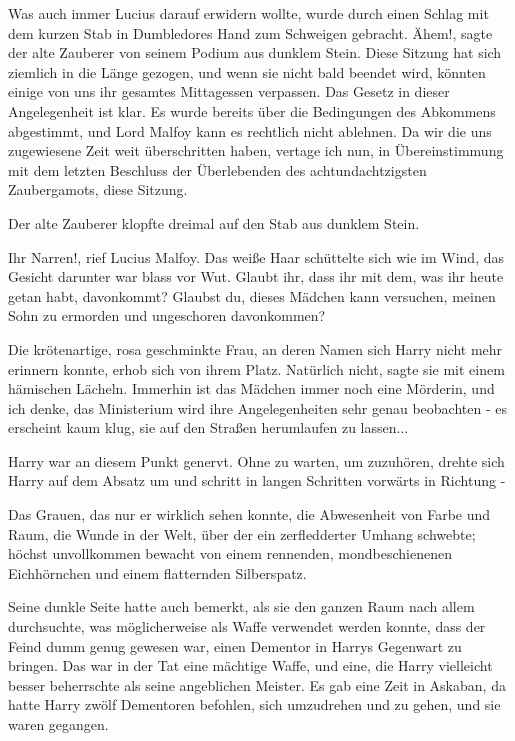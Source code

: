 Was auch immer Lucius darauf erwidern wollte, wurde durch einen Schlag mit dem
kurzen Stab in Dumbledores Hand zum Schweigen gebracht. \glqq{}Ähem!\grqq{},
sagte der alte Zauberer von seinem Podium aus dunklem Stein. \glqq{}Diese Sitzung
hat sich ziemlich in die Länge gezogen, und wenn sie nicht bald beendet wird,
könnten einige von uns ihr gesamtes Mittagessen verpassen. Das Gesetz in dieser
Angelegenheit ist klar. Es wurde bereits über die Bedingungen des Abkommens
abgestimmt, und Lord Malfoy kann es rechtlich nicht ablehnen. Da wir die uns
zugewiesene Zeit weit überschritten haben, vertage ich nun, in Übereinstimmung
mit dem letzten Beschluss der Überlebenden des achtundachtzigsten Zaubergamots,
diese Sitzung.\grqq{}

Der alte Zauberer klopfte dreimal auf den Stab aus dunklem Stein.

\glqq{}Ihr Narren!\grqq{}, rief Lucius Malfoy. Das weiße Haar schüttelte sich wie
im Wind, das Gesicht darunter war blass vor Wut. \glqq{}Glaubt ihr, dass ihr mit
dem, was ihr heute getan habt, davonkommt? Glaubst du, dieses Mädchen kann
versuchen, meinen Sohn zu ermorden und ungeschoren davonkommen?\grqq{}

Die krötenartige, rosa geschminkte Frau, an deren Namen sich Harry nicht mehr
erinnern konnte, erhob sich von ihrem Platz. \glqq{}Natürlich nicht\grqq{}, sagte
sie mit einem hämischen Lächeln. \glqq{}Immerhin ist das Mädchen immer noch eine
Mörderin, und ich denke, das Ministerium wird ihre Angelegenheiten sehr genau
beobachten - es erscheint kaum klug, sie auf den Straßen herumlaufen zu
lassen...\grqq{}

Harry war an diesem Punkt genervt. Ohne zu warten, um zuzuhören, drehte sich
Harry auf dem Absatz um und schritt in langen Schritten vorwärts in Richtung -

Das Grauen, das nur er wirklich sehen konnte, die Abwesenheit von Farbe und
Raum, die Wunde in der Welt, über der ein zerfledderter Umhang schwebte; höchst
unvollkommen bewacht von einem rennenden, mondbeschienenen Eichhörnchen und
einem flatternden Silberspatz.

Seine dunkle Seite hatte auch bemerkt, als sie den ganzen Raum nach allem
durchsuchte, was möglicherweise als Waffe verwendet werden konnte, dass der
Feind dumm genug gewesen war, einen Dementor in Harrys Gegenwart zu bringen. Das
war in der Tat eine mächtige Waffe, und eine, die Harry vielleicht besser
beherrschte als seine angeblichen Meister. Es gab eine Zeit in Askaban, da hatte
Harry zwölf Dementoren befohlen, sich umzudrehen und zu gehen, und sie waren
gegangen.

